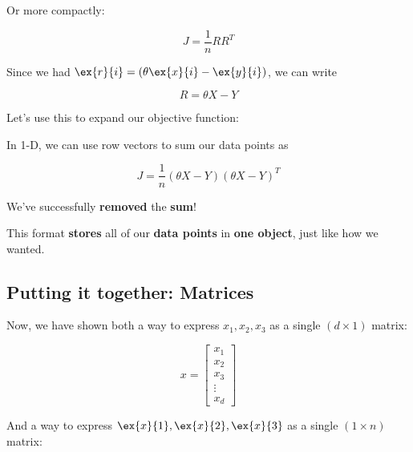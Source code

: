         Or more compactly:
        
        \begin{equation}
            J = \frac{1}{n} RR^T
        \end{equation}

        Since we had $\ex{r}{i} = (\theta \ex{x}{i} - \ex{y}{i} )$, we can write 
        
        \begin{equation}
            R = \theta X - Y
        \end{equation}
        
        Let's use this to expand our objective function:\\
        
        \begin{concept}
            In 1-D, we can use row vectors to sum our data points as
            
            \begin{equation*}
                J = \frac{1}{n} (\theta X - Y)(\theta X - Y)^T
            \end{equation*}
        \end{concept}
        
        We've successfully \textbf{removed} the \textbf{sum}!
        
        This format \textbf{stores} all of our \textbf{data points} in \textbf{one object}, just like how we wanted.
        
    \subsection{Putting it together: Matrices}
    
        Now, we have shown both a way to express $x_1, x_2, x_3$ as a single $(d \times 1)$ matrix:
        
        \begin{equation}
            x = 
            \begin{bmatrix}
              x_1 \\ x_2 \\ x_3 \\ \vdots \\ x_d
            \end{bmatrix}
        \end{equation}
        
        And a way to express $\ex{x}{1}, \ex{x}{2}, \ex{x}{3}$ as a single $(1 \times n)$ matrix:
        
